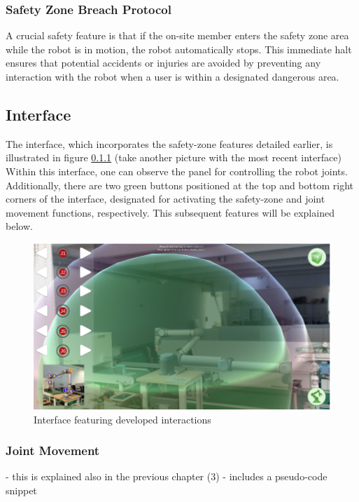         \subsubsection{Safety Zone Breach Protocol}

            A crucial safety feature is that if the on-site member enters the safety zone area while the robot is in motion, the robot 
            automatically stops. This immediate halt ensures that potential accidents or injuries are avoided by preventing any interaction 
            with the robot when a user is within a designated dangerous area.
                
    \subsection{Interface}

        The interface, which incorporates the safety-zone features detailed earlier, is illustrated in figure \ref{} (take another picture with the most recent interface) 
        Within this interface, one can observe the panel for controlling the robot joints. Additionally, there are two green buttons 
        positioned at the top and bottom right corners of the interface, designated for activating the safety-zone and joint movement functions, 
        respectively. This subsequent features will be explained below.

        \begin{figure}[h]
            \centering
            \includegraphics[width=1\linewidth]{figs/interface.png}
            \caption{Interface featuring developed interactions}
            \label{fig: interface}
        \end{figure}

        \subsubsection{Joint Movement} - this is explained also in the previous chapter (3) - includes a pseudo-code snippet

